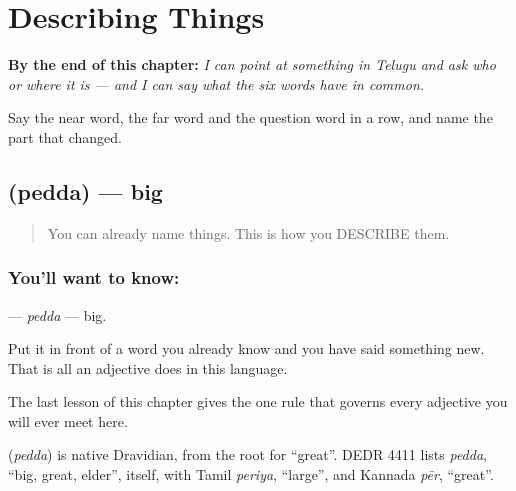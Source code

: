 
\chapter{Describing Things}
\label{ch:te-describing-things}

\begin{chapteropening}
\textbf{By the end of this chapter:} \emph{I can point at something in Telugu and ask who or where it is — and I can say what the six words have in common.}

Say the near word, the far word and the question word in a row, and name the part that changed.
\end{chapteropening}

\section[\texorpdfstring{\te{పెద్ద} (pedda)}{పెద్ద (pedda)}]{ (pedda) — big}

\label{lesson:TE-C42-big}



\begin{quote}
You can already name things. This is how you DESCRIBE them.
\end{quote}

\subsection*{You'll want to know: }
\textbf{} — \emph{pedda} — big.

Put it in front of a word you already know and you have said something new. That is all an adjective does in this language.

The last lesson of this chapter gives the one rule that governs every adjective you will ever meet here.

\begin{cousinweb}
\textbf{} (\emph{pedda}) is native Dravidian, from the root for \textquotedblleft{}great\textquotedblright{}. DEDR 4411 lists \emph{pedda}, \textquotedblleft{}big, great, elder\textquotedblright{}, itself, with Tamil \emph{periya}, \textquotedblleft{}large\textquotedblright{}, and Kannada \emph{pēr}, \textquotedblleft{}great\textquotedblright{}.
\end{cousinweb}

